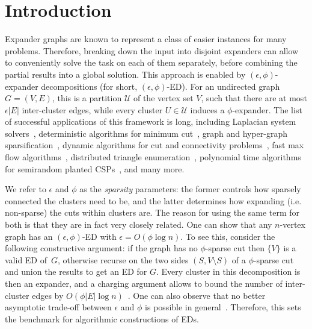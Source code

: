 \section{Introduction}
Expander graphs are known to represent a class of easier instances for many problems. Therefore, breaking down the input into disjoint expanders can allow to conveniently solve the task on each of them separately, before combining the partial results into a global solution. This approach is enabled by $(\epsilon, \phi)$-expander decompositions (for short, $(\epsilon, \phi)$-ED). For an undirected graph $G=(V,E)$, this is a partition $\mathcal{U}$ of the vertex set $V$, such that there are at most $\epsilon |E|$ inter-cluster edges, while every cluster $U \in \mathcal{U}$ induces a $\phi$-expander. The list of successful applications of this framework is long, including Laplacian system solvers~\cite{stlapl}, deterministic algorithms for minimum cut~\cite{mincutjli}, graph and hyper-graph sparsification~\cite{stspectral, chugao, hgsparse,svapprox}, dynamic algorithms for cut and connectivity problems~\cite{boundlink,sublinearconn}, fast max flow algorithms~\cite{maxflow}, distributed triangle enumeration~\cite{triang}, polynomial time algorithms for semirandom planted CSPs~\cite{csps}, and many more.

We refer to $\epsilon$ and $\phi$ as the \emph{sparsity} parameters: the former controls how sparsely connected the clusters need to be, and the latter determines how expanding (i.e. non-sparse) the cuts within clusters are. The reason for using the same term for both is that they are in fact very closely related. One can show that any $n$-vertex graph has an $(\epsilon,\phi)$-ED with $\epsilon = O(\phi \log n)$. To see this, consider the following constructive argument: if the graph has no $\phi$-sparse cut then $\{V\}$ is a valid ED of~$G$, otherwise recurse on the two sides $(S,V \setminus S)$ of a $\phi$-sparse cut and union the results to get an ED for $G$. Every cluster in this decomposition is then an expander, and a charging argument allows to bound the number of inter-cluster edges by $O(\phi |E| \log n)$~\cite{offlineexpdec}. One can also observe that no better asymptotic trade-off between $\epsilon$ and $\phi$ is possible in general~\cite{clusteringhypercube}. Therefore, this sets the benchmark for algorithmic constructions of EDs.

